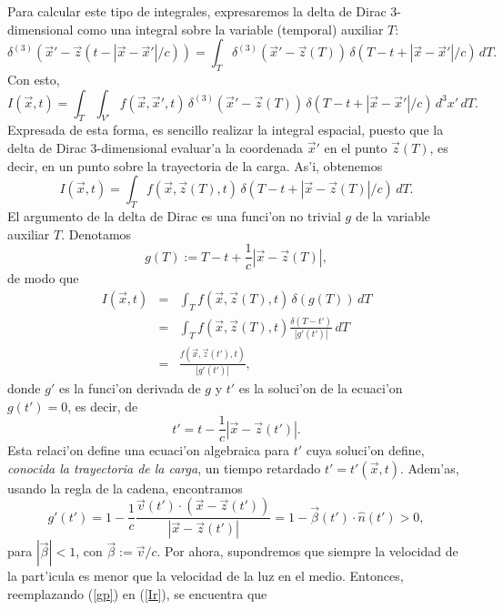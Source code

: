 Para calcular este tipo de integrales, expresaremos la delta de Dirac 3-dimensional como una integral sobre la variable (temporal) auxiliar $T$:
\begin{equation}
 \delta^{(3)}(\vec{x}'-\vec{z}(t-|\vec{x}-\vec{x}'|/c))=\int_T \delta^{(3)}(\vec{x}'-\vec{z}(T))\,\delta(T-t+|\vec{x}-\vec{x}'|/c)\, dT.
\end{equation}
Con esto,
\begin{equation}
I(\vec{x},t)=\int_{T}\int_{V'}
f(\vec{x},\vec{x}',t)\,\delta^{(3)}(\vec{x}'-\vec{z}(T))\,\delta(T-t+|\vec{x}-\vec{x}'|/c)\,d^3x' \, dT. \label{potretqgm11}
\end{equation}
Expresada de esta forma, es sencillo realizar la integral espacial, puesto que la delta de Dirac 3-dimensional evaluar'a la coordenada $\vec{x}'$ en el punto $\vec{z}(T)$, es decir, en un punto sobre la trayectoria de la carga. As'i, obtenemos
\begin{equation}
I(\vec{x},t)=\int_{T}f(\vec{x},\vec{z}(T),t)\,\delta(T-t+|\vec{x}-\vec{z}(T)|/c)\, dT. \label{potretqgm12}
\end{equation}
El argumento de la delta de Dirac es una funci'on no trivial $g$ de la variable auxiliar $T$. Denotamos
\begin{equation}
 g(T):=T-t+\frac{1}{c}|\vec{x}-\vec{z}(T)|,
\end{equation}
de modo que
\begin{eqnarray}
I(\vec{x},t)&=&\int_{T}f(\vec{x},\vec{z}(T),t)\,\delta(g(T))\, dT \\
&=&\int_{T}f(\vec{x},\vec{z}(T),t)\frac{\delta(T-t')}{|g'(t')|}\, dT \\
&=&\frac{f(\vec{x},\vec{z}(t'),t)}{|g'(t')|}, \label{Ir}
\end{eqnarray}
donde $g'$ es la funci'on derivada de $g$ y $t'$ es la soluci'on de la ecuaci'on $g(t')=0$, es decir, de
\begin{equation}
 t'=t-\frac{1}{c}|\vec{x}-\vec{z}(t')|. \label{t'}
\end{equation}
Esta relaci'on define una ecuaci'on algebraica para $t'$ cuya soluci'on define, \textit{conocida la trayectoria de la carga}, un tiempo retardado $t'=t'(\vec{x},t)$. Adem'as, usando la regla de la cadena, encontramos
\begin{equation}
 g'(t')=1-\frac{1}{c}\frac{\vec{v}(t')\cdot\left(\vec{x}-\vec{z}(t')\right)}{\left|\vec{x}-\vec{z}(t')\right|}=1-\vec{\beta}(t')\cdot\hat{n}(t')>0 \label{gp},
\end{equation}
para $|\vec\beta|<1$, con $\vec\beta:=\vec{v}/c$. Por ahora, supondremos que siempre la velocidad de la part'icula es menor que la velocidad de la luz en el medio. Entonces, reemplazando (\ref{gp}) en (\ref{Ir}), se encuentra que
